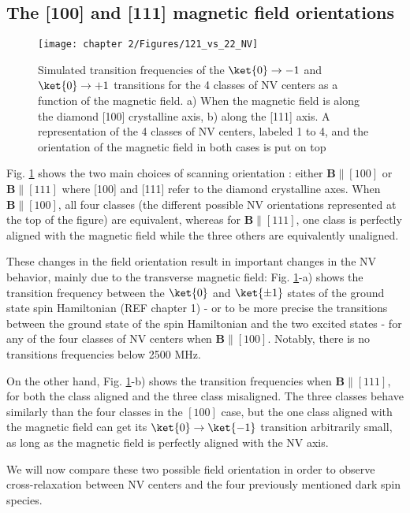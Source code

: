 \documentclass[a4paper, 11pt]{book}
\begin{document}
\subsection{The [100] and [111] magnetic field orientations}
\label{sec simu}

\begin{figure}[h]
\centering
\texttt{[image: chapter 2/Figures/121\_vs\_22\_NV]}
\caption{Simulated transition frequencies of the $\ket{0} \to {-1}$ and $\ket{0} \to {+1}$ transitions for the 4 classes of NV centers as a function of the magnetic field. a) When the magnetic field is along the diamond [100] crystalline axis, b) along the [111] axis. A representation of the 4 classes of NV centers, labeled 1 to 4, and the orientation of the magnetic field in both cases is put on top}
\label{121 vs 22 NV}
\end{figure}

Fig. \ref{121 vs 22 NV} shows the two main choices of scanning orientation : either $\mathbf{B} \parallel [100]$ or 
$\mathbf{B} \parallel [111]$ where [100] and [111] refer to the diamond crystalline axes. When $\mathbf{B} \parallel [100]$, all four classes (the different possible NV orientations represented at the top of the figure) are equivalent, whereas for $\mathbf{B} \parallel [111]$, one class is perfectly aligned with the magnetic field while the three others are equivalently unaligned. 

These changes in the field orientation result in important changes in the NV behavior, mainly due to the transverse magnetic field: Fig. \ref{121 vs 22 NV}-a) shows the transition frequency between the $\ket{0}$ and $\ket{\pm 1}$ states of the ground state spin Hamiltonian (REF chapter 1) - or to be more precise the transitions between the ground state of the spin Hamiltonian and the two excited states - for any of the four classes of NV centers when $\mathbf{B} \parallel [100]$. Notably, there is no transitions frequencies below 2500 MHz. 

On the other hand, Fig. \ref{121 vs 22 NV}-b) shows the transition frequencies when $\mathbf{B} \parallel [111]$, for both the class aligned and the three class misaligned. The three classes behave similarly than the four classes in the $[100]$ case, but the one class aligned with the magnetic field can get its $\ket{0}\to\ket{-1}$ transition arbitrarily small, as long as the magnetic field is perfectly aligned with the NV axis.

We will now compare these two possible field orientation in order to observe cross-relaxation between NV centers and the four previously mentioned dark spin species.
\end{document}
